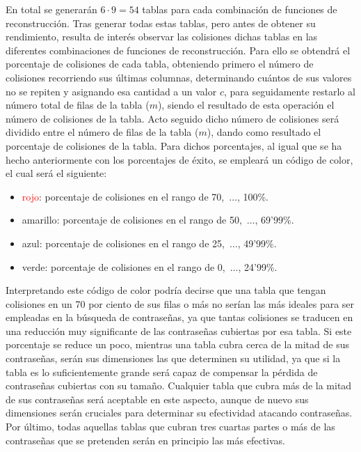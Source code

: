 \documentclass[12pt,spanish,listoffigures,listoftables,listofalgorithms]{tfgetsinf}
\begin{document}
En total se generarán $6 \cdot 9 = 54$ tablas para cada combinación de funciones de reconstrucción. Tras generar todas estas tablas, pero antes de obtener su rendimiento, resulta de interés observar las colisiones dichas tablas en las diferentes combinaciones de funciones de reconstrucción. Para ello se obtendrá el porcentaje de colisiones de cada tabla, obteniendo primero el número de colisiones recorriendo sus últimas columnas, determinando cuántos de sus valores no se repiten y asignando esa cantidad a un valor $c$, para seguidamente restarlo al número total de filas de la tabla ($m$), siendo el resultado de esta operación el número de colisiones de la tabla. Acto seguido dicho número de colisiones será dividido entre el número de filas de la tabla ($m$), dando como resultado el porcentaje de colisiones de la tabla. Para dichos porcentajes, al igual que se ha hecho anteriormente con los porcentajes de éxito, se empleará un código de color, el cual será el siguiente:

\begin{itemize}

    \item \textcolor{red}{rojo}: porcentaje de colisiones en el rango de 70,~$\dots$, 100\%.
    
    \item \textcolor{y}{amarillo}: porcentaje de colisiones en el rango de 50,~$\dots$, 69'99\%.
    
    \item \textcolor{b}{azul}: porcentaje de colisiones en el rango de 25,~$\dots$, 49'99\%.

    \item \textcolor{g}{verde}: porcentaje de colisiones en el rango de 0,~$\dots$, 24'99\%.
    
\end{itemize}

Interpretando este código de color podría decirse que una tabla que tengan colisiones en un 70 por ciento de sus filas o más no serían las más ideales para ser empleadas en la búsqueda de contraseñas, ya que tantas colisiones se traducen en una reducción muy significante de las contraseñas cubiertas por esa tabla. Si este porcentaje se reduce un poco, mientras una tabla cubra cerca de la mitad de sus contraseñas, serán sus dimensiones las que determinen su utilidad, ya que si la tabla es lo suficientemente grande será capaz de compensar la pérdida de contraseñas cubiertas con su tamaño. Cualquier tabla que cubra más de la mitad de sus contraseñas será aceptable en este aspecto, aunque de nuevo sus dimensiones serán cruciales para determinar su efectividad atacando contraseñas. Por último, todas aquellas tablas que cubran tres cuartas partes o más de las contraseñas que se pretenden serán en principio las más efectivas.
\end{document}
